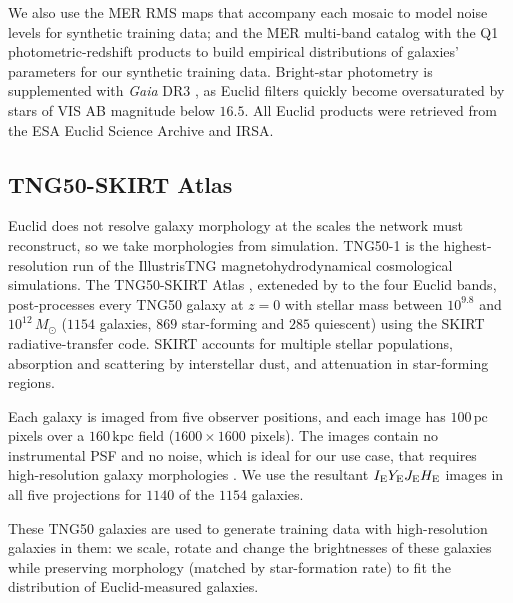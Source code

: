 \documentclass[linenumbers,trackchanges,twocolumn]{aastex701}
\begin{document}
We also use the MER RMS maps that accompany each mosaic to model noise levels for synthetic training data; and the MER multi-band catalog with the Q1 photometric-redshift products to build empirical distributions of galaxies' parameters for our synthetic training data.
Bright-star photometry is supplemented with \textit{Gaia} DR3 \citep{GaiaDR3}, as Euclid filters quickly become oversaturated by stars of  VIS AB magnitude below $16.5$.
All Euclid products were retrieved from the ESA Euclid Science Archive and IRSA.

\subsection{TNG50-SKIRT Atlas}\label{sec:data_tng}
Euclid does not resolve galaxy morphology at the scales the network must reconstruct, so we take morphologies from simulation.
TNG50-1 \citep{Pillepich2019,Nelson2019} is the highest-resolution run of the IllustrisTNG magnetohydrodynamical cosmological simulations.
The TNG50-SKIRT Atlas \citep{Baes2024TNG50SKIRT}, exteneded by \citet{Kovacic2025} to the four Euclid bands, post-processes every TNG50 galaxy at $z=0$ with stellar mass between $10^{9.8}$ and $10^{12}\,M_\odot$ ($1154$ galaxies, $869$ star-forming and $285$ quiescent) using the SKIRT radiative-transfer code.
SKIRT accounts for multiple stellar populations, absorption and scattering by interstellar dust, and attenuation in star-forming regions.

Each galaxy is imaged from five observer positions, and each image has $100\,\mathrm{pc}$ pixels over a $160\,\mathrm{kpc}$ field ($1600\times1600$ pixels).
The images contain no instrumental PSF and no noise, which is ideal for our use case, that requires high-resolution galaxy morphologies \citep{Kovacic2025}.
We use the resultant $I_{\rm E}Y_{\rm E}J_{\rm E}H_{\rm E}$ images in all five projections for $1140$ of the $1154$ galaxies.

These TNG50 galaxies are used to generate training data with high-resolution galaxies in them: we scale, rotate and change the brightnesses of these galaxies while preserving morphology (matched by star-formation rate) to fit the distribution of Euclid-measured galaxies.
\end{document}
